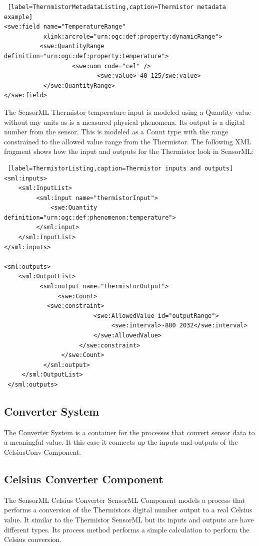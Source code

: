 \documentclass[]{final_report}
\begin{document}
\begin{lstlisting} [label=ThernmistorMetadataListing,caption=Thermistor metadata example]
<swe:field name="TemperatureRange" 
           xlink:arcrole="urn:ogc:def:property:dynamicRange">
          <swe:QuantityRange definition="urn:ogc:def:property:temperature">
                   <swe:uom code="cel" /> 
                          <swe:value>-40 125/swe:value> 
           </swe:QuantityRange>
</swe:field>
\end{lstlisting}

The SensorML Thermistor temperature input is modeled using a Quantity value without any units as is a measured physical phenomena. Its output is a digital number from the sensor. This is modeled as a Count type with the range constrained to the allowed value range from the Thermistor. The following XML fragment shows how the input and outputs for the Thermistor look in SensorML:

\begin{lstlisting} [label=ThermistorListing,caption=Thermistor inputs and outputs]
<sml:inputs>
    <sml:InputList>
         <sml:input name="thermistorInput">
             <swe:Quantity definition="urn:ogc:def:phenomenon:temperature">
         </sml:input>
    </sml:InputList>
</sml:inputs>

<sml:outputs>
    <sml:OutputList>
          <sml:output name="thermistorOutput">
               <swe:Count>
	        <swe:constraint>
                         <swe:AllowedValue id="outputRange">
                              <swe:interval>-880 2032</swe:interval>
                         </swe:AllowedValue>
                     </swe:constraint>
                </swe:Count>
           </sml:output>
     </sml:OutputList>
 </sml:outputs>
\end{lstlisting}

\subsection{Converter System}
The Converter System is a container for the processes that convert sensor data to a meaningful value. It this case it connects up the inputs and outputs of the CelsiusConv Component. 
\subsection{Celsius Converter Component}

The SensorML Celsius Converter SensorML Component  models a process that performs a conversion of the Thermistors digital number output to a real Celsius value. It similar to the Thermistor SensorML but its inputs and outputs are have different types. Its process method performs a simple calculation to perform the Celsius conversion.
\end{document}
